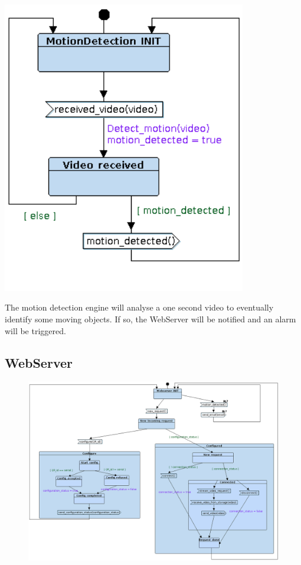 \documentclass{article}
\begin{document}
\begin{minipage}{\linewidth}
  \centering
  \begin{minipage}{0.6\linewidth}
    \centering
    \includegraphics[width = 0.8\textwidth]{Foscam10.png}
  \end{minipage}
  \begin{minipage}{0.35\linewidth}
    The motion detection engine will analyse a one second video to eventually
    identify some moving objects. If so, the WebServer will be notified and
    an alarm will be triggered.
  \end{minipage}
\end{minipage}

\newpage
\subsection{WebServer}
\label{sec:WebServer}

\begin{figure}[h!]
  \centering
  \includegraphics[width = \textwidth]{Foscam09.png}
\end{figure}
\end{document}
